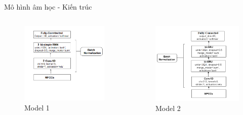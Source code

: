 \documentclass[10pt,a4paper,openany]{beamer}
\begin{document}
	\begin{frame}{Mô hình âm học - Kiến trúc}  \pause
		\begin{columns}
			\begin{column}{0.5\textwidth}
				\begin{figure}[htbp]
					\centerline{\includegraphics[scale=0.45]{charts/model1.png}}
					\caption{Model 1}
					\label{fig_model1}
				\end{figure}  \pause
			\end{column}
			\begin{column}{0.5\textwidth}
				\begin{figure}[htbp]
					\centerline{\includegraphics[scale=0.45]{charts/model2.png}}
					\caption{Model 2}
					\label{fig_model2}
				\end{figure}
			\end{column}
		\end{columns}
	\end{frame}
	
\end{document}
